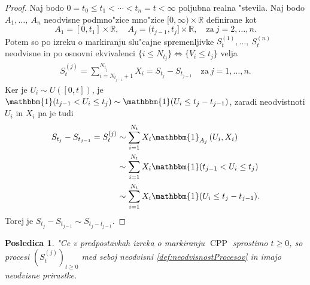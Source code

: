 \documentclass[12pt, a4paper, reqno]{amsart}
\theoremstyle{definition}
\theoremstyle{plain}
\newtheorem{posledica}[definicija]{Posledica}
\newcommand{\R}{\mathbb{R}}
\newcommand{\1}{\mathds{1}}
\DeclareMathOperator{\CPP}{CPP}
\newcommand*{\refPriloga}[1]{%
  \begingroup
    \hypersetup{
      linkcolor=red,
      linkbordercolor=red,
    }%
    \ref{#1}%
  \endgroup
}
\begin{document}
        \begin{proof}
            Naj bodo $0=t_0\leq t_1 < \cdots < t_n = t < \infty$
            poljubna realna "stevila. Naj bodo $A_1, \dots, \ A_n$ neodvisne podmno"zice
            mno"zice $[0, \infty) \times \R$ definirane kot
            \begin{equation*}
                A_1 = [0, t_1]\times \R, \quad A_j = (t_{j-1}, t_j]\times \R, \quad \text{za} \ j = 2, \dots, n.
            \end{equation*}
            Potem so po izreku o markiranju slu"cajne spremenljivke $S_{t}^{(1)}, \dots, \ S_{t}^{(n)}$ neodvisne in 
            po osnovni ekvivalenci $\{i\leq N_{t_j}\} \iff \{V_i \leq t_j\}$ velja 
            \begin{align*}
                S^{(j)}_{t} = 
                \sum_{i = N_{t_{j-1}}+ 1}^{N_{t_j}}X_i = S_{t_j} - S_{t_{j-1}} \quad \text{za} \ j = 1, \dots, n.
            \end{align*}
            Ker je $U_i \sim U([0, t])$, je $\mathbbm{1}({t_{j-1}} < U_i\leq t_j) \sim \mathbbm{1}(U_i \leq t_j - t_{j-1})$, 
            zaradi neodvistnoti $U_i$ in $X_i$ pa je tudi 
            \begin{align*}
                S_{t_j} - S_{t_{j-1}} = S_t^{(j)} &\sim \sum_{i=1}^{N_t}X_i\mathbbm{1}_{A_j}\left(U_i, X_i\right) \\
                &\sim \sum_{i=1}^{N_t}X_i\mathbbm{1}({t_{j-1}} < U_i\leq t_j) \\
                &\sim \sum_{i=1}^{N_t}X_i\mathbbm{1}(U_i \leq t_j - t_{j-1}).
            \end{align*}
            Torej je $S_{t_j} - S_{t_{j-1}} \sim S_{t_j - t_{j-1}}$.
        \end{proof}

        \begin{posledica}
            "Ce v predpostavkah izreka o markiranju $\CPP$ sprostimo $t\geq0$, so procesi $(S_t^{(j)})_{t\geq0}$ 
            med seboj neodvisni \refPriloga{def:neodvisnostProcesov} in imajo neodvisne prirastke. 
            \label{pos:neodvisnostCPPmedSabo}
        \end{posledica}
\end{document}

